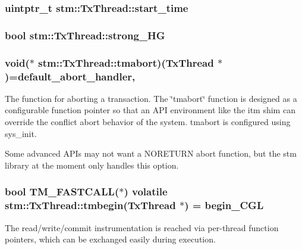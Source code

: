 \hypertarget{structstm_1_1TxThread_a6fe8a3d6580bcbb43f2ddad98130f542}{
\subsubsection[{start\-\_\-time}]{\setlength{\rightskip}{0pt plus 5cm}uintptr\-\_\-t stm\-::\-Tx\-Thread\-::start\-\_\-time}}\label{structstm_1_1TxThread_a6fe8a3d6580bcbb43f2ddad98130f542}
\hypertarget{structstm_1_1TxThread_af4130eccc384e6c423fd29797c4a8aba}{
\subsubsection[{strong\-\_\-\-H\-G}]{\setlength{\rightskip}{0pt plus 5cm}bool stm\-::\-Tx\-Thread\-::strong\-\_\-\-H\-G}}\label{structstm_1_1TxThread_af4130eccc384e6c423fd29797c4a8aba}
\hypertarget{structstm_1_1TxThread_a5ca3c353e5b0e305d841b48aceb4de2f}{
\subsubsection[{tmabort}]{ void($\ast$ stm\-::\-Tx\-Thread\-::tmabort)({\bf Tx\-Thread} $\ast$)=default\-\_\-abort\-\_\-handler\hspace{0.3cm}{\ttfamily [static]}, {\ttfamily [default]}}}\label{structstm_1_1TxThread_a5ca3c353e5b0e305d841b48aceb4de2f}
The function for aborting a transaction. The \char`\"{}tmabort\char`\"{} function is designed as a configurable function pointer so that an A\-P\-I environment like the itm shim can override the conflict abort behavior of the system. tmabort is configured using sys\-\_\-init.

Some advanced A\-P\-Is may not want a N\-O\-R\-E\-T\-U\-R\-N abort function, but the stm library at the moment only handles this option. \hypertarget{structstm_1_1TxThread_a4822898342c30b679a25a8a2dd46c747}{
\subsubsection[{tmbegin}]{\setlength{\rightskip}{0pt plus 5cm}bool {\bf T\-M\-\_\-\-F\-A\-S\-T\-C\-A\-L\-L}($\ast$) volatile stm\-::\-Tx\-Thread\-::tmbegin({\bf Tx\-Thread} $\ast$) = {\bf begin\-\_\-\-C\-G\-L}\hspace{0.3cm}{\ttfamily [static]}}}\label{structstm_1_1TxThread_a4822898342c30b679a25a8a2dd46c747}
The read/write/commit instrumentation is reached via per-\/thread function pointers, which can be exchanged easily during execution.

